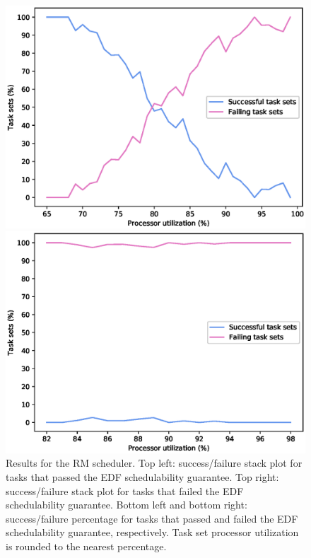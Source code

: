\begin{figure}[htpb]
\begin{minipage}{0.62\textwidth}
        \includegraphics[width=\textwidth]{figures/crossover_rm_succ.eps}
    \end{minipage}%
    \begin{minipage}{0.62\textwidth}
        \includegraphics[width=\textwidth]{figures/crossover_rm_fail.eps}
    \end{minipage}
    \caption{Results for the RM scheduler. Top left: success/failure stack plot for tasks that passed the EDF schedulability guarantee. Top right: success/failure stack plot for tasks that failed the EDF schedulability guarantee. Bottom left and bottom right: success/failure percentage for tasks that passed and failed the EDF schedulability guarantee, respectively. Task set processor utilization is rounded to the nearest percentage.}
    \label{fig:rmresults}
\end{figure}

